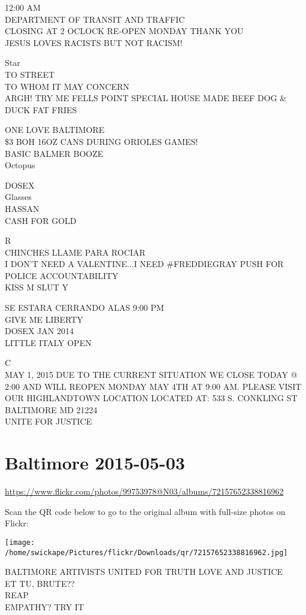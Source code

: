 \documentclass[10pt,letterpaper]{article}
\begin{document}
12:00 AM\\
DEPARTMENT OF TRANSIT AND TRAFFIC\\
CLOSING AT 2 OCLOCK RE{-}OPEN MONDAY THANK YOU\\
JESUS LOVES RACISTS BUT NOT RACISM!

Star\\
TO STREET\\
TO WHOM IT MAY CONCERN\\
ARGH!  TRY ME FELLS POINT SPECIAL HOUSE MADE BEEF DOG \& DUCK FAT FRIES

ONE LOVE BALTIMORE\\
\$3 BOH 16OZ CANS DURING ORIOLES GAMES!\\
BASIC BALMER BOOZE\\
Octopus

DOSEX\\
Glasses\\
HASSAN\\
CASH FOR GOLD

R\\
CHINCHES LLAME PARA ROCIAR\\
I DON'T NEED A VALENTINE...I NEED \#FREDDIEGRAY PUSH FOR POLICE ACCOUNTABILITY\\
KISS M SLUT Y

SE ESTARA CERRANDO ALAS 9:00 PM\\
GIVE ME LIBERTY\\
DOSEX JAN 2014\\
LITTLE ITALY OPEN

C\\
MAY 1, 2015  DUE TO THE CURRENT SITUATION WE CLOSE TODAY @ 2:00 AND WILL REOPEN MONDAY MAY 4TH AT 9:00 AM.  PLEASE VISIT OUR HIGHLANDTOWN LOCATION LOCATED AT: 533 S. CONKLING ST BALTIMORE MD 21224\\
UNITE FOR JUSTICE


\section*{Baltimore 2015-05-03}

\url{https://www.flickr.com/photos/99753978@N03/albums/72157652338816962}

Scan the QR code below to go to the original album with full-size photos on Flickr:

\texttt{[image: /home/swickape/Pictures/flickr/Downloads/qr/72157652338816962.jpg]}


BALTIMORE ARTIVISTS UNITED FOR TRUTH LOVE AND JUSTICE\\
ET TU, BRUTE??\\
REAP\\
EMPATHY?  TRY IT
\end{document}
